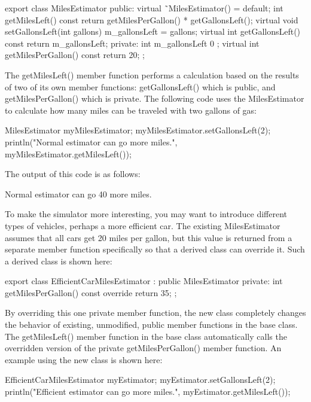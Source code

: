 \begin{cpp}
export class MilesEstimator
{
    public:
        virtual ˜MilesEstimator() = default;
        int getMilesLeft() const { return getMilesPerGallon() * getGallonsLeft(); }
        virtual void setGallonsLeft(int gallons) { m_gallonsLeft = gallons; }
        virtual int getGallonsLeft() const { return m_gallonsLeft; }
    private:
        int m_gallonsLeft { 0 };
        virtual int getMilesPerGallon() const { return 20; }
};
\end{cpp}

The getMilesLeft() member function performs a calculation based on the results of two of its own member functions: getGallonsLeft() which is public, and getMilesPerGallon() which is private. The following code uses the MilesEstimator to calculate how many miles can be traveled with two gallons of gas:

\begin{cpp}
MilesEstimator myMilesEstimator;
myMilesEstimator.setGallonsLeft(2);
println("Normal estimator can go {} more miles.",
    myMilesEstimator.getMilesLeft());
\end{cpp}

The output of this code is as follows:

\begin{shell}
Normal estimator can go 40 more miles.
\end{shell}

To make the simulator more interesting, you may want to introduce different types of vehicles, perhaps a more efficient car. The existing MilesEstimator assumes that all cars get 20 miles per gallon, but this value is returned from a separate member function specifically so that a derived class can override it. Such a derived class is shown here:

\begin{cpp}
export class EfficientCarMilesEstimator : public MilesEstimator
{
    private:
        int getMilesPerGallon() const override { return 35; }
};
\end{cpp}

By overriding this one private member function, the new class completely changes the behavior of existing, unmodified, public member functions in the base class. The getMilesLeft() member function in the base class automatically calls the overridden version of the private getMilesPerGallon() member function. An example using the new class is shown here:

\begin{cpp}
EfficientCarMilesEstimator myEstimator;
myEstimator.setGallonsLeft(2);
println("Efficient estimator can go {} more miles.",
        myEstimator.getMilesLeft());
\end{cpp}

